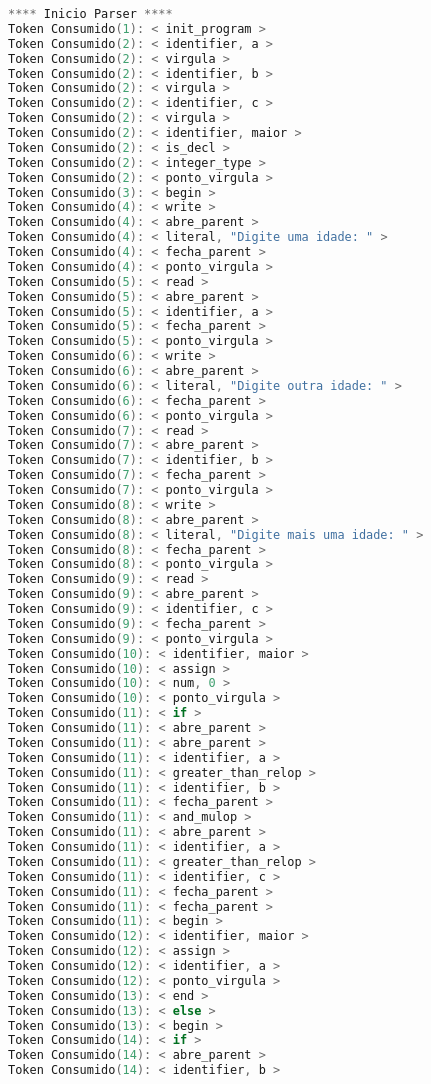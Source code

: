 \begin{lstlisting}[caption={Saida Correta para o Codigo de teste  : Teste6.txt},label={Entrada 1},language=C]
**** Inicio Parser ****
Token Consumido(1): < init_program >
Token Consumido(2): < identifier, a >
Token Consumido(2): < virgula >
Token Consumido(2): < identifier, b >
Token Consumido(2): < virgula >
Token Consumido(2): < identifier, c >
Token Consumido(2): < virgula >
Token Consumido(2): < identifier, maior >
Token Consumido(2): < is_decl >
Token Consumido(2): < integer_type >
Token Consumido(2): < ponto_virgula >
Token Consumido(3): < begin >
Token Consumido(4): < write >
Token Consumido(4): < abre_parent >
Token Consumido(4): < literal, "Digite uma idade: " >
Token Consumido(4): < fecha_parent >
Token Consumido(4): < ponto_virgula >
Token Consumido(5): < read >
Token Consumido(5): < abre_parent >
Token Consumido(5): < identifier, a >
Token Consumido(5): < fecha_parent >
Token Consumido(5): < ponto_virgula >
Token Consumido(6): < write >
Token Consumido(6): < abre_parent >
Token Consumido(6): < literal, "Digite outra idade: " >
Token Consumido(6): < fecha_parent >
Token Consumido(6): < ponto_virgula >
Token Consumido(7): < read >
Token Consumido(7): < abre_parent >
Token Consumido(7): < identifier, b >
Token Consumido(7): < fecha_parent >
Token Consumido(7): < ponto_virgula >
Token Consumido(8): < write >
Token Consumido(8): < abre_parent >
Token Consumido(8): < literal, "Digite mais uma idade: " >
Token Consumido(8): < fecha_parent >
Token Consumido(8): < ponto_virgula >
Token Consumido(9): < read >
Token Consumido(9): < abre_parent >
Token Consumido(9): < identifier, c >
Token Consumido(9): < fecha_parent >
Token Consumido(9): < ponto_virgula >
Token Consumido(10): < identifier, maior >
Token Consumido(10): < assign >
Token Consumido(10): < num, 0 >
Token Consumido(10): < ponto_virgula >
Token Consumido(11): < if >
Token Consumido(11): < abre_parent >
Token Consumido(11): < abre_parent >
Token Consumido(11): < identifier, a >
Token Consumido(11): < greater_than_relop >
Token Consumido(11): < identifier, b >
Token Consumido(11): < fecha_parent >
Token Consumido(11): < and_mulop >
Token Consumido(11): < abre_parent >
Token Consumido(11): < identifier, a >
Token Consumido(11): < greater_than_relop >
Token Consumido(11): < identifier, c >
Token Consumido(11): < fecha_parent >
Token Consumido(11): < fecha_parent >
Token Consumido(11): < begin >
Token Consumido(12): < identifier, maior >
Token Consumido(12): < assign >
Token Consumido(12): < identifier, a >
Token Consumido(12): < ponto_virgula >
Token Consumido(13): < end >
Token Consumido(13): < else >
Token Consumido(13): < begin >
Token Consumido(14): < if >
Token Consumido(14): < abre_parent >
Token Consumido(14): < identifier, b >

\end{lstlisting}
